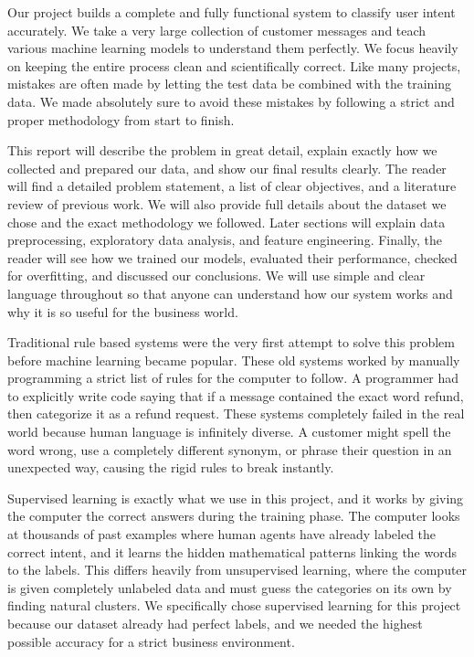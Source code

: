\documentclass[12pt]{article}
\begin{document}
Our project builds a complete and fully functional system to classify user intent accurately. We take a very large collection of customer messages and teach various machine learning models to understand them perfectly. We focus heavily on keeping the entire process clean and scientifically correct. Like many projects, mistakes are often made by letting the test data be combined with the training data. We made absolutely sure to avoid these mistakes by following a strict and proper methodology from start to finish. 

This report will describe the problem in great detail, explain exactly how we collected and prepared our data, and show our final results clearly. The reader will find a detailed problem statement, a list of clear objectives, and a literature review of previous work. We will also provide full details about the dataset we chose and the exact methodology we followed. Later sections will explain data preprocessing, exploratory data analysis, and feature engineering. Finally, the reader will see how we trained our models, evaluated their performance, checked for overfitting, and discussed our conclusions. We will use simple and clear language throughout so that anyone can understand how our system works and why it is so useful for the business world.


Traditional rule based systems were the very first attempt to solve this problem before machine learning became popular. These old systems worked by manually programming a strict list of rules for the computer to follow. A programmer had to explicitly write code saying that if a message contained the exact word refund, then categorize it as a refund request. These systems completely failed in the real world because human language is infinitely diverse. A customer might spell the word wrong, use a completely different synonym, or phrase their question in an unexpected way, causing the rigid rules to break instantly.

Supervised learning is exactly what we use in this project, and it works by giving the computer the correct answers during the training phase. The computer looks at thousands of past examples where human agents have already labeled the correct intent, and it learns the hidden mathematical patterns linking the words to the labels. This differs heavily from unsupervised learning, where the computer is given completely unlabeled data and must guess the categories on its own by finding natural clusters. We specifically chose supervised learning for this project because our dataset already had perfect labels, and we needed the highest possible accuracy for a strict business environment.
\end{document}
